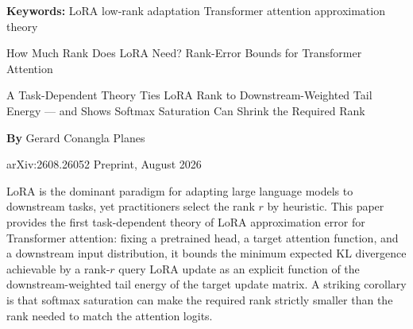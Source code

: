 \documentclass[10pt,twocolumn]{article}
\begin{document}
\setlength{\parindent}{0pt}
\setlength{\parskip}{4pt}

{\small\color{keywordgray}\textbf{Keywords:}
  LoRA \textbullet{}
  low-rank adaptation \textbullet{}
  Transformer attention \textbullet{}
  approximation theory}\par\vspace{4pt}

{\LARGE\bfseries\raggedright
  How Much Rank Does LoRA Need?
  Rank-Error Bounds for Transformer Attention}\par\vspace{4pt}

{\large\itshape\raggedright
  A Task-Dependent Theory Ties LoRA Rank to
  Downstream-Weighted Tail Energy — and Shows Softmax
  Saturation Can Shrink the Required Rank}\par\vspace{6pt}

{\small\textbf{By} Gerard Conangla Planes}\par\vspace{2pt}

{\small\color{keywordgray}arXiv:2608.26052 \textbullet{} Preprint, August 2026}
\par\vspace{2pt}\noindent{\color{rulered}\rule{\columnwidth}{0.6pt}}\vspace{6pt}

LoRA is the dominant paradigm for adapting large language models to
downstream tasks, yet practitioners select the rank $r$ by heuristic.
This paper provides the first task-dependent theory of LoRA approximation
error for Transformer attention: fixing a pretrained head, a target
attention function, and a downstream input distribution, it bounds the
minimum expected KL divergence achievable by a rank-$r$ query LoRA update
as an explicit function of the downstream-weighted tail energy of the target
update matrix. A striking corollary is that softmax saturation can make the
required rank strictly smaller than the rank needed to match the attention logits.
\end{document}
